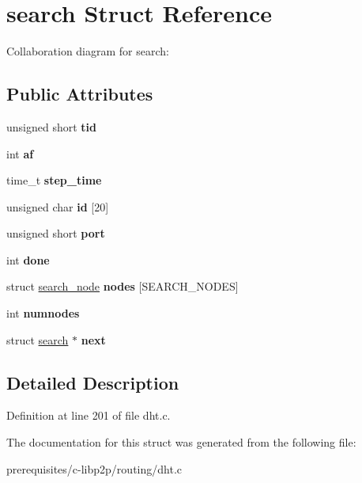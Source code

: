 \hypertarget{structsearch}{}\section{search Struct Reference}
\label{structsearch}


Collaboration diagram for search\+:
\subsection*{Public Attributes}
\begin{DoxyCompactItemize}
\item 
\mbox{\label{structsearch_a73cf316598c427c5dfcbaede83d87628}} 
unsigned short {\bfseries tid}
\item 
\mbox{\label{structsearch_a56251142df01bd4185cad31b55ef3f14}} 
int {\bfseries af}
\item 
\mbox{\label{structsearch_ab6a220b1b3cde06bb022a920f9dd4ced}} 
time\+\_\+t {\bfseries step\+\_\+time}
\item 
\mbox{\label{structsearch_a86080951aad946ff3904185aa4135c62}} 
unsigned char {\bfseries id} \mbox{[}20\mbox{]}
\item 
\mbox{\label{structsearch_a681f2d6e654482a4b80b7630ea4ba8bc}} 
unsigned short {\bfseries port}
\item 
\mbox{\label{structsearch_afa6a41d9b071b2d24105fca18c1eba78}} 
int {\bfseries done}
\item 
\mbox{\label{structsearch_a285810fe5384856df2bedf7015b61737}} 
struct \mbox{\hyperlink{structsearch__node}{search\+\_\+node}} {\bfseries nodes} \mbox{[}S\+E\+A\+R\+C\+H\+\_\+\+N\+O\+D\+ES\mbox{]}
\item 
\mbox{\label{structsearch_aac0447fd4fdeace314eb9c51ef2de288}} 
int {\bfseries numnodes}
\item 
\mbox{\label{structsearch_ac77cd1c752e6b5f78f345ba0a7c7decd}} 
struct \mbox{\hyperlink{structsearch}{search}} $\ast$ {\bfseries next}
\end{DoxyCompactItemize}


\subsection{Detailed Description}


Definition at line 201 of file dht.\+c.



The documentation for this struct was generated from the following file\+:\begin{DoxyCompactItemize}
\item 
prerequisites/c-\/libp2p/routing/dht.\+c\end{DoxyCompactItemize}
